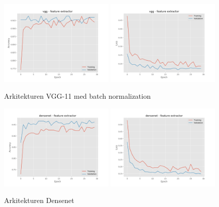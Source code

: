 \documentclass{kththesis}
\begin{document}
    \begin{figure}
      \centering
      \includegraphics[width=0.49\textwidth]{"./balcony/balcony-20split - acc - vgg - feature extractor"}
      \includegraphics[width=0.49\textwidth]{"./balcony/balcony-20split - loss - vgg - feature extractor"}
      \caption{Arkitekturen VGG-11 med batch normalization}
    \end{figure}
    \begin{figure}
      \centering
      \includegraphics[width=0.49\textwidth]{"./balcony/balcony-20split - acc - densenet - feature extractor"}
      \includegraphics[width=0.49\textwidth]{"./balcony/balcony-20split - loss - densenet - feature extractor"}
      \caption{Arkitekturen Densenet}
    \end{figure}
\end{document}
